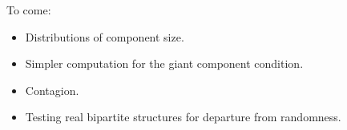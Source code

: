 \begin{frame}
  \begin{block}{To come:}
    \begin{itemize}
    \item 
      Distributions of component size.
    \item 
      Simpler computation for the giant component condition.
    \item 
      Contagion.
    \item 
      Testing real bipartite structures for departure from randomness.
    \end{itemize}
  \end{block}
\end{frame}

\begin{comment}


\begin{frame}
  \frametitle{}


\end{frame}


\begin{frame}
  \frametitle{}

  \begin{center}
    \texttt{[image: newman2001b\_fig7-tp-5]}
  \end{center}

\end{frame}

\begin{frame}
  \frametitle{}

  \begin{center}
    \texttt{[image: newman2001b\_fig8-tp-5]}
  \end{center}

\end{frame}

\begin{frame}
  \frametitle{}

  \begin{center}
    \texttt{[image: newman2001b\_fig9-tp-5]}
  \end{center}

\end{frame}

\begin{frame}
  \frametitle{}

  \begin{center}
    \texttt{[image: newman2001b\_fig10-tp-5]}
  \end{center}

\end{frame}


\section{Nutshell}

\end{comment}
